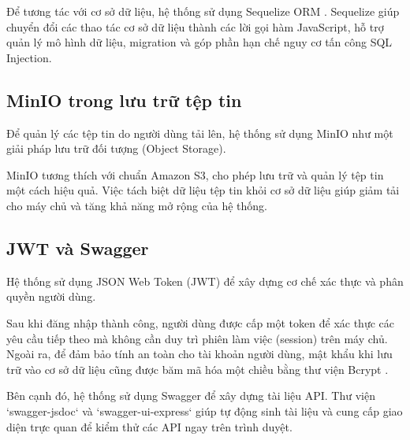 \documentclass[../DoAn.tex]{subfiles}
\begin{document}
Để tương tác với cơ sở dữ liệu, hệ thống sử dụng Sequelize ORM \cite{sequelize}. Sequelize giúp chuyển đổi các thao tác cơ sở dữ liệu thành các lời gọi hàm JavaScript, hỗ trợ quản lý mô hình dữ liệu, migration và góp phần hạn chế nguy cơ tấn công SQL Injection.
\subsection{MinIO trong lưu trữ tệp tin}
\label{subsection:3.2.3}
Để quản lý các tệp tin do người dùng tải lên, hệ thống sử dụng MinIO như một giải pháp lưu trữ đối tượng (Object Storage).

MinIO tương thích với chuẩn Amazon S3, cho phép lưu trữ và quản lý tệp tin một cách hiệu quả. Việc tách biệt dữ liệu tệp tin khỏi cơ sở dữ liệu giúp giảm tải cho máy chủ và tăng khả năng mở rộng của hệ thống.
\subsection{JWT và Swagger}
\label{subsection:3.2.4}
Hệ thống sử dụng JSON Web Token (JWT) \cite{jwt} để xây dựng cơ chế xác thực và phân quyền người dùng.

Sau khi đăng nhập thành công, người dùng được cấp một token để xác thực các yêu cầu tiếp theo mà không cần duy trì phiên làm việc (session) trên máy chủ. Ngoài ra, để đảm bảo tính an toàn cho tài khoản người dùng, mật khẩu khi lưu trữ vào cơ sở dữ liệu cũng được băm mã hóa một chiều bằng thư viện Bcrypt \cite{bcrypt}.

Bên cạnh đó, hệ thống sử dụng Swagger để xây dựng tài liệu API. Thư viện `swagger-jsdoc` và `swagger-ui-express` giúp tự động sinh tài liệu và cung cấp giao diện trực quan để kiểm thử các API ngay trên trình duyệt.
\end{document}
